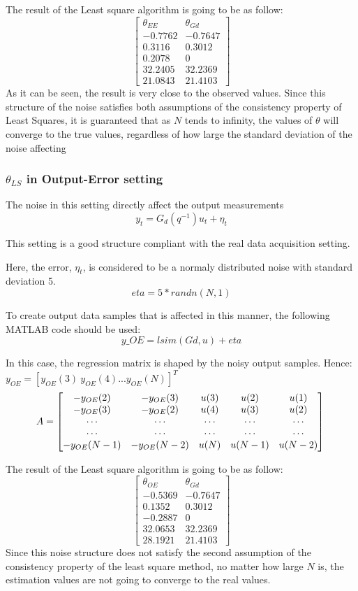 The result of the Least square algorithm is going to be as follow:
\[
\begin{bmatrix}
    \theta_{EE} & \theta_{Gd} \\
    -0.7762 & -0.7647 \\
     0.3116 & 0.3012 \\
     0.2078 & 0 \\
    32.2405 & 32.2369 \\
    21.0843 & 21.4103
\end{bmatrix}
\]
As it can be seen, the result is very close to the observed values. Since this structure of the noise satisfies both assumptions of the consistency property of Least Squares, it is guaranteed that as \(N\) tends to infinity, the values of \(\theta\) will converge to the true values, regardless of how large the standard deviation of the noise affecting

\subsubsection{\(\theta_{LS}\) in Output-Error setting}
The noise in this setting directly affect the output measurements
\[
y_t = G_d(q^{-1})u_t + \eta_t
\]
\begin{QandAbox}
This setting is a good structure compliant with the real data acquisition setting.
\end{QandAbox}
Here, the error, \(\eta_t\), is considered to be a normaly distributed noise with standard deviation 5.
\[
eta = 5 * randn(N,1)
\]

To create output data samples that is affected in this manner, the following MATLAB code should be used:
\[
y\_OE = lsim(Gd,u) + eta
\]

In this case, the regression matrix is shaped by the noisy output samples. Hence:
\(y_{OE} = [y_{OE}(3) \: y_{OE}(4) ... y_{OE}(N)]^T 
\)
\[
    A = \left[
    \begin{matrix}
    -y_{OE}(2) & -y_{OE}(3) & u(3) & u(2) & u(1) \\
    -y_{OE}(3) & -y_{OE}(2) & u(4) & u(3) & u(2) \\
    \cdots & \cdots & \cdots & \cdots & \cdots   \\
    \cdots & \cdots & \cdots & \cdots & \cdots   \\
    -y_{OE}(N-1) & -y_{OE}(N-2) & u(N) & u(N-1) & u(N-2)
    \end{matrix} 
    \right]\\
\]

The result of the Least square algorithm is going to be as follow:
\[
\begin{bmatrix}
    \theta_{OE} & \theta_{Gd} \\
    -0.5369 & -0.7647 \\
     0.1352 & 0.3012 \\
    -0.2887 & 0 \\
    32.0653 & 32.2369 \\
    28.1921 & 21.4103
\end{bmatrix}
\]
Since this noise structure does not satisfy the second assumption of the consistency property of the least square method, no matter how large \(N\) is, the estimation values are not going to converge to the real values.

